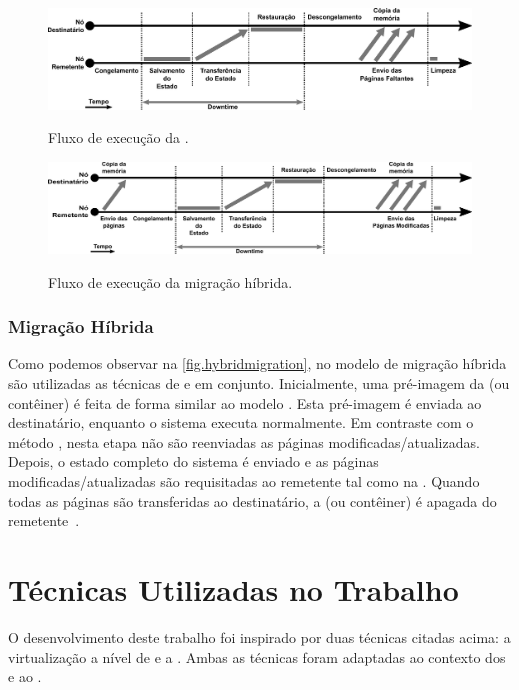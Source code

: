 \begin{figure}[bt]
    \centering
    \caption{Fluxo de execução da \postcopymigration.}
    \includegraphics[width=0.8\linewidth]{content/images/post-copy-migration-flow.pdf}
    \label{fig.postcopy}
\end{figure}

\begin{figure}[ht!]
    \centering
    \caption{Fluxo de execução da migração híbrida.}
    \includegraphics[width=0.8\linewidth]{content/images/hybrid-migration-flow.pdf}
    \label{fig.hybridmigration}
\end{figure}

\subsubsection{Migração Híbrida}\label{sec.hybridmigration}
Como podemos observar na \autoref{fig.hybridmigration}, no modelo de migração híbrida são utilizadas as técnicas de \precopy e \postcopy em conjunto. Inicialmente, uma pré-imagem da \vm (ou contêiner) é feita de forma similar ao modelo \precopymigration. Esta pré-imagem é enviada ao destinatário, enquanto o sistema executa normalmente. Em contraste com o método \precopy, nesta etapa não são reenviadas as páginas modificadas/atualizadas. Depois, o estado completo do sistema é enviado e as páginas modificadas/atualizadas são requisitadas ao remetente tal como na \postcopymigration. Quando todas as páginas são transferidas ao destinatário, a \vm (ou contêiner) é apagada do remetente~\cite{singh2022predictive, imran2022live}.

\section{Técnicas Utilizadas no Trabalho}

O desenvolvimento deste trabalho foi inspirado por duas técnicas citadas acima: a virtualização a nível de \so e a \precopymigration. Ambas as técnicas foram adaptadas ao contexto dos \lws e ao \nanvix.

